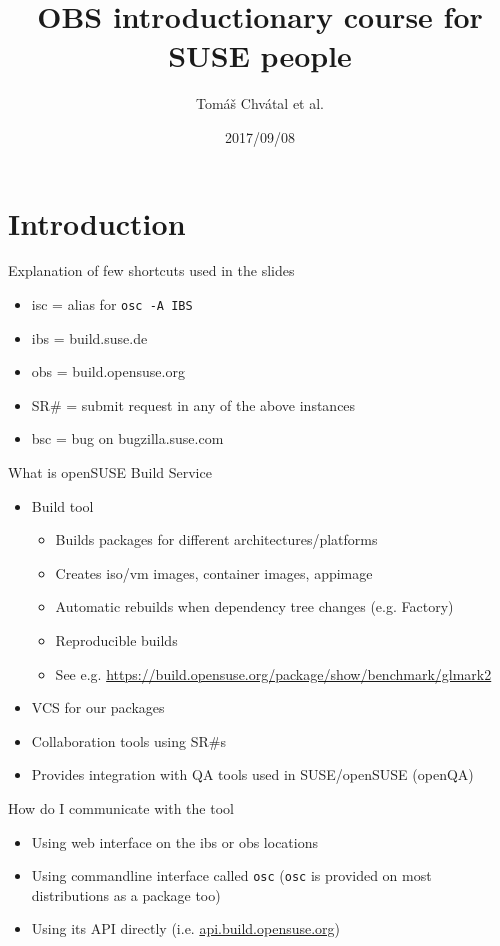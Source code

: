 \documentclass{beamer}
\author{Tom\'{a}\v{s} Chv\'{a}tal et al.\newline {\small tchvatal@suse.com}\newline {\small Packaging/L3 - Packaging}}
\title{OBS introductionary course for SUSE people}
\date{2017/09/08}
\begin{document}
\begin{frame}[t,plain]
\titlepage
\end{frame}

\section{Introduction}

\begin{frame}[t]{Explanation of few shortcuts used in the slides}
	\begin{itemize}
	\item isc = alias for \texttt{osc -A IBS}
	\item ibs = build.suse.de
	\item obs = build.opensuse.org
	\item SR\# = submit request in any of the above instances
	\item bsc = bug on bugzilla.suse.com
	\end{itemize}
\end{frame}

\begin{frame}[t]{What is openSUSE Build Service}
	\begin{itemize}
	\item Build tool
    \begin{itemize}
      \item Builds packages for different architectures/platforms
      \item Creates iso/vm images, container images, appimage
      \item Automatic rebuilds when dependency tree changes (e.g. Factory)
      \item Reproducible builds
      \item See e.g. \url{https://build.opensuse.org/package/show/benchmark/glmark2}
    \end{itemize}
	\item VCS for our packages
	\item Collaboration tools using SR\#s
  \item Provides integration with QA tools used in SUSE/openSUSE (openQA)
	\end{itemize}
\end{frame}

\begin{frame}[t]{How do I communicate with the tool}
	\begin{itemize}
	\item Using web interface on the ibs or obs locations
	\item Using commandline interface called \texttt{osc} (\texttt{osc} is provided on most distributions as a package too)
  \item Using its API directly (i.e. \url{api.build.opensuse.org})
	\end{itemize}
\end{frame}
\end{document}
